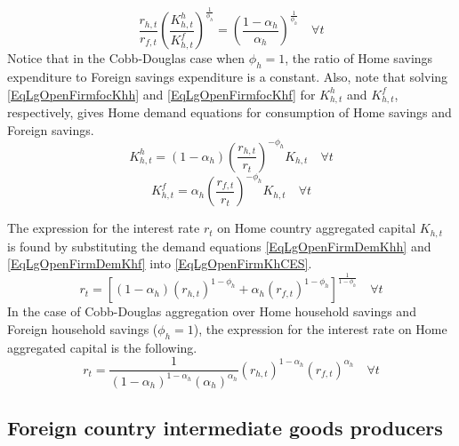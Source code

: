 \documentclass[letterpaper,12pt]{article}
\theoremstyle{definition}
\begin{document}
    \begin{equation}\label{EqLgOpenFirmFracCapDomFor}
      \frac{ r_{h,t}}{r_{f,t}}\left(\frac{K^h_{h,t}}{K^f_{h,t}}\right)^{\frac{1}{\phi_h}} = \left(\frac{1-\alpha_h}{\alpha_h}\right)^{\frac{1}{\phi_h}} \quad\forall t
    \end{equation}
    Notice that in the Cobb-Douglas case when $\phi_h=1$, the ratio of Home savings expenditure to Foreign savings expenditure is a constant. Also, note that solving \eqref{EqLgOpenFirmfocKhh} and \eqref{EqLgOpenFirmfocKhf} for $K^h_{h,t}$ and $K^f_{h,t}$, respectively, gives Home demand equations for consumption of Home savings and Foreign savings.
    \begin{equation}\label{EqLgOpenFirmDemKhh}
      K^h_{h,t} = (1-\alpha_h)\left(\frac{r_{h,t}}{r_t}\right)^{-\phi_h}K_{h,t} \quad\forall t
    \end{equation}
    \begin{equation}\label{EqLgOpenFirmDemKhf}
      K^f_{h,t} = \alpha_h \left(\frac{r_{f,t}}{r_t}\right)^{-\phi_h}K_{h,t} \quad\forall t
    \end{equation}

    The expression for the interest rate $r_t$ on Home country aggregated capital $K_{h,t}$ is found by substituting the demand equations \eqref{EqLgOpenFirmDemKhh} and \eqref{EqLgOpenFirmDemKhf} into \eqref{EqLgOpenFirmKhCES}.
    \begin{equation}\label{EqLgOpenFirmAggR_h}
      r_t = \left[(1-\alpha_h)\left(r_{h,t}\right)^{1-\phi_h} + \alpha_h\left(r_{f,t}\right)^{1-\phi_h}\right]^{\frac{1}{1-\phi_h}} \quad\forall t
    \end{equation}
    In the case of Cobb-Douglas aggregation over Home household savings and Foreign household savings ($\phi_h=1$), the expression for the interest rate on Home aggregated capital is the following.
    \begin{equation}\label{EqLgOpenFirmAggR_h_Cobb}
      r_t = \frac{1}{(1-\alpha_h)^{1-\alpha_h}(\alpha_h)^{\alpha_h}} \left(r_{h,t}\right)^{1-\alpha_h}\left(r_{f,t}\right)^{\alpha_h} \quad\forall t
    \end{equation}


  \subsection{Foreign country intermediate goods producers}\label{SecLgOpenFirmIntd_F}
\end{document}
